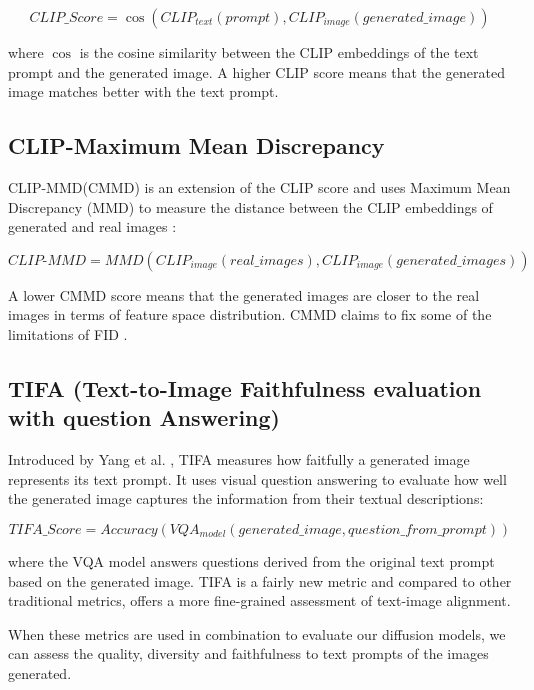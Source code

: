 \documentclass{article}
\begin{document}
\begin{equation}
    CLIP\_Score = \cos(CLIP_{text}(prompt), CLIP_{image}(generated\_image))
\end{equation}

where $\cos$ is the cosine similarity between the CLIP embeddings of the text prompt and the generated image.
A higher CLIP score means that the generated image matches better with the text prompt.

\subsection{CLIP-Maximum Mean Discrepancy}

CLIP-MMD(CMMD) is an extension of the CLIP score and uses Maximum Mean Discrepancy (MMD) to measure the distance between the 
CLIP embeddings of generated and real images \cite{gao2022measuring}:

\begin{equation}
    CLIP\text{-}MMD = MMD(CLIP_{image}(real\_images), CLIP_{image}(generated\_images))
\end{equation}

A lower CMMD score means that the generated images are closer to the real images in terms of feature space distribution. CMMD claims to 
fix some of the limitations of FID \cite{rethinkingFID2024}.

\subsection{TIFA (Text-to-Image Faithfulness evaluation with question Answering)}

Introduced by Yang et al. \cite{yang2022empirical}, TIFA measures how faitfully a generated image represents its text prompt.
It uses visual question answering to evaluate how well the generated image captures the information from their textual descriptions:

\begin{equation}
    TIFA\_Score = Accuracy(VQA_{model}(generated\_image, question\_from\_prompt))
\end{equation}

where the VQA model answers questions derived from the original text prompt based on the generated image. 
TIFA is a fairly new metric and compared to other traditional metrics, offers a more fine-grained assessment of text-image alignment.

When these metrics are used in combination to evaluate our diffusion models, we can assess the quality, diversity and faithfulness
to text prompts of the images generated.
\end{document}
